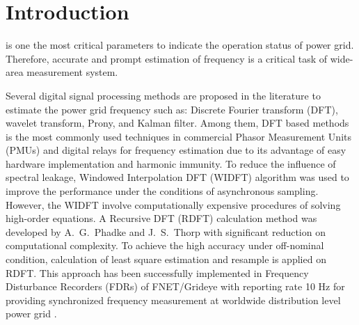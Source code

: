 \documentclass[journal,twoside]{IEEEtran}
\begin{document}
%
\IEEEpeerreviewmaketitle

\section{Introduction}
% 
% 
% 
% 

 is one the most critical parameters to indicate the operation status of  power grid. Therefore, accurate and prompt estimation of frequency is a critical task of wide-area measurement system.

Several digital signal processing methods are proposed  in the literature to estimate the power grid frequency such as: Discrete Fourier transform (DFT)\cite{7438889}, wavelet transform\cite{7981350}, Prony\cite{8263521}, and  Kalman filter\cite{Bagheri2016}.
Among them, DFT based methods is the most commonly
used techniques in commercial Phasor Measurement Units (PMUs) and digital relays for frequency estimation due to its advantage of easy hardware implementation and harmonic immunity\cite{7277049,5876287}. To reduce the influence of spectral leakage, Windowed Interpolation DFT (WIDFT) algorithm was used to improve the performance under the conditions of asynchronous sampling\cite{4956674}.
However, the WIDFT involve computationally expensive procedures of solving high-order equations.
A Recursive DFT (RDFT) calculation method was developed by A.~G.~Phadke and J.~S.~Thorp with significant reduction on computational complexity\cite{5519136}. To achieve the high accuracy under  off-nominal condition, calculation of least square estimation and resample is applied on RDFT\cite{chenjian}. This approach has been successfully implemented in  Frequency Disturbance
Recorders (FDRs) of FNET/Grideye with reporting rate 10 Hz for providing synchronized frequency measurement at worldwide distribution level power grid \cite{7265090,7849130}.
\end{document}
